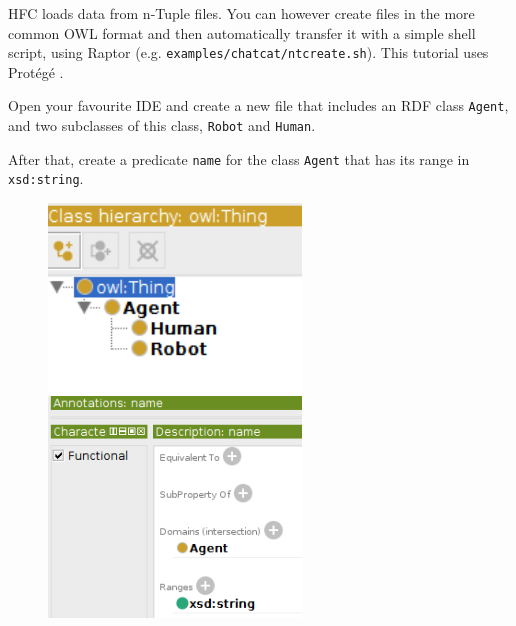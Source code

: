 \documentclass[a4paper]{report}
\begin{document}
HFC loads data from n-Tuple files. You can however create files in the more
common OWL format and then automatically transfer it with a simple shell
script, using Raptor \citep{raptor}
(e.g. \texttt{examples/chatcat/ntcreate.sh}). This tutorial uses Protégé
\citep{Protege}.

Open your favourite IDE and create a new file that includes an RDF class \texttt{Agent},
and two subclasses of this class, \texttt{Robot} and \texttt{Human}.

After that, create a predicate \texttt{name} for the class \texttt{Agent} that has its
range in \texttt{xsd:string}.

\begin{figure}
	\center
	    \begin{minipage}{0.45\textwidth}
		\centering
		\includegraphics[width=0.6\textwidth]{Images/doc_protege.png}
	\end{minipage}\hfill
	\begin{minipage}{0.45\textwidth}
		\centering
		\includegraphics[width=0.6\textwidth]{Images/doc_protege2.png}
	\end{minipage}
\end{figure}
\end{document}
